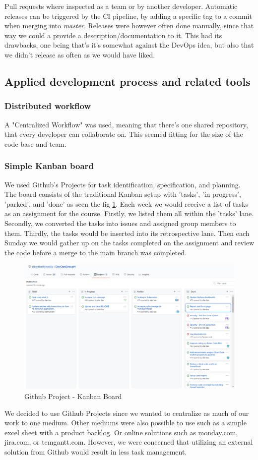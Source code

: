 \documentclass{article}
\begin{document}
Pull requests where inspected as a team or by another developer.
Automatic releases can be triggered by the CI pipeline, by adding a specific tag to a commit when merging into \textit{master}. Releases were however often done manually, since that way we could a provide a description/documentation to it. This had its drawbacks, one being that's it's somewhat against the DevOps idea, but also that we didn't release as often as we would have liked.   

\subsection{Applied development process and related tools}
\subsubsection*{Distributed workflow}
A "Centralized Workflow" was used, meaning that there's one shared repository, that every developer can collaborate on. This seemed fitting for the size of the code base and team.

\subsubsection*{Simple Kanban board}
We used Github's Projects for task identification, specification, and planning. The board consists of the traditional Kanban setup with 'tasks', 'in progress', 'parked', and 'done' as seen the fig \ref{fig:kanban}. Each week we would receive a list of tasks as an assignment for the course. Firstly, we listed them all within the 'tasks' lane. Secondly, we converted the tasks into issues and assigned group members to them. Thirdly, the tasks would be inserted into its retrospective lane. Then each Sunday we would gather up on the tasks completed on the assignment and review the code before a merge to the main branch was completed. 
\begin{figure}[H]
\centering
\includegraphics[width=1\textwidth]{images/kanban.png}
\caption{\label{fig:kanban} Github Project - Kanban Board}
\end{figure}
We decided to use Github Projects since we wanted to centralize as much of our work to one medium. Other mediums were also possible to use such as a simple excel sheet with a product backlog. Or online solutions such as monday.com, jira.com, or temgantt.com. However, we were concerned that utilizing an external solution from Github would result in less task management.  
\end{document}
